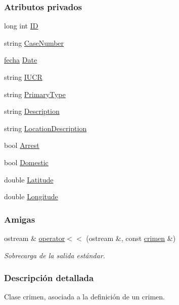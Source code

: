 \subsubsection*{Atributos privados}
\begin{DoxyCompactItemize}
\item 
long int \hyperlink{classcrimen_a59702f88f0b0c25781ae3d296790dcb8}{I\-D}
\item 
string \hyperlink{classcrimen_a710fbf07b3e543c2a1b2e625b144050a}{Case\-Number}
\item 
\hyperlink{classfecha}{fecha} \hyperlink{classcrimen_a43fdb792dbc2e2927592fad7fb8b224c}{Date}
\item 
string \hyperlink{classcrimen_a064e0e02109feaea19f254ef47a2510c}{I\-U\-C\-R}
\item 
string \hyperlink{classcrimen_acc4a8a9f688d306a38519899a8c325a7}{Primary\-Type}
\item 
string \hyperlink{classcrimen_aa51b9ddc58248aadefdb8fad7d4cd69b}{Description}
\item 
string \hyperlink{classcrimen_a221f7065c470883388174f19ea34d1f3}{Location\-Description}
\item 
bool \hyperlink{classcrimen_acf24dca899efd9bf99574f3be0b5ce52}{Arrest}
\item 
bool \hyperlink{classcrimen_a53f0bfea0c8ebb03dda9bf7332057477}{Domestic}
\item 
double \hyperlink{classcrimen_adaf728df1dacff5a93678d3feb512b7f}{Latitude}
\item 
double \hyperlink{classcrimen_a9ffd3c64d12cc4b963b890b8db645964}{Longitude}
\end{DoxyCompactItemize}
\subsubsection*{Amigas}
\begin{DoxyCompactItemize}
\item 
ostream \& \hyperlink{classcrimen_a70d7dbf132d06cb3c889042765a7da2e}{operator$<$$<$} (ostream \&, const \hyperlink{classcrimen}{crimen} \&)
\begin{DoxyCompactList}\small\item\em Sobrecarga de la salida estándar. \end{DoxyCompactList}\end{DoxyCompactItemize}


\subsubsection{Descripción detallada}
Clase crimen, asociada a la definición de un crimen. 

